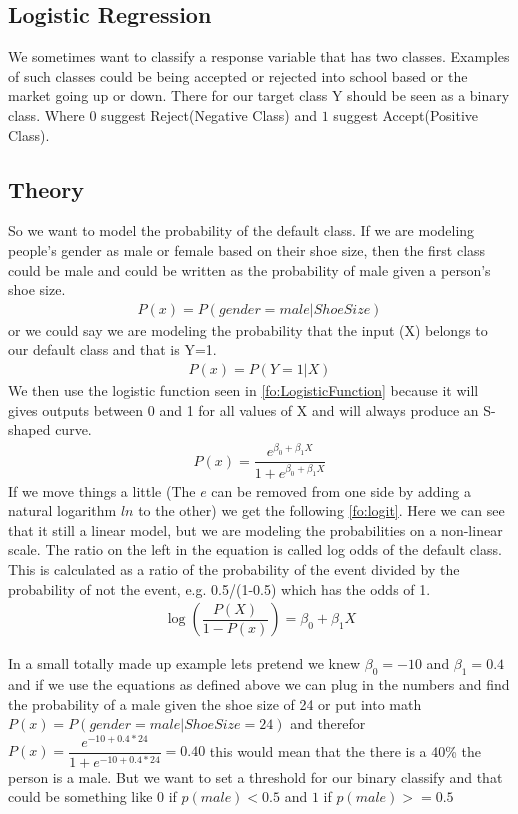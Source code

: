 \subsection{Logistic Regression}\label{sc:logisticRegression}
We sometimes want to classify a response variable that has two classes. Examples of such classes could be being accepted or rejected into school based or the market going up or down. There for our target class Y should be seen as a binary class. Where $0$ suggest Reject(Negative Class) and $1$ suggest Accept(Positive Class).
\subsection{Theory}
So we want to model the probability of the default class. If we are modeling people’s gender as male or female based on their shoe size, then the first class could be male and could be written as the probability of male given a person’s shoe size.
\begin{align}\label{fo:logit}
P(x) = P(gender=male|ShoeSize)
\end{align}
or we could say we are modeling the probability that the input (X) belongs to our default class and that is Y=1.
\begin{align}\label{fo:probability}
P(x) = P(Y=1|X)
\end{align}
We then use the logistic function seen in \ref{fo:LogisticFunction} because it will gives outputs between 0 and 1 for all values of X and will always produce an S-shaped curve.
\begin{align}\label{fo:LogisticFunction}
P(x) = \dfrac{ e^{\beta_0 + \beta_1 X}}{  1 + e^{\beta_0 + \beta_1 X}}
\end{align}
If we move things a little (The $e$ can be removed from one side by adding a natural logarithm $ln$ to the other) we get the following \ref{fo:logit}. Here we can see that it still a linear model, but we are modeling the probabilities on a non-linear scale.
The ratio on the left in the equation is called log odds of the default class. This is calculated as a ratio of the probability of the event divided by the probability of not the event, e.g. 0.5/(1-0.5) which has the odds of 1.
 \begin{align}\label{fo:logit}
\log( \dfrac{ P(X)}{1-P(x)} ) = \beta_0 + \beta_1 X
\end{align}

In a small totally made up example lets pretend we knew $\beta_0 = -10 $ and $ \beta_1 = 0.4 $ and if we use the equations as defined above we can plug in the numbers and find the probability of a male given the shoe size of 24 or put into math $P(x) = P(gender=male|ShoeSize=24)$ and therefor $P(x) = \dfrac{ e^{-10 + 0.4*24}}{1 + e^{-10 + 0.4*24}} = 0.40$ this would mean that the there is a 40\% the person is a male. But we want to set a threshold for our binary classify and that could be something like $0$ if $p(male) < 0.5$ and $1$ if $ p(male) >= 0.5$

